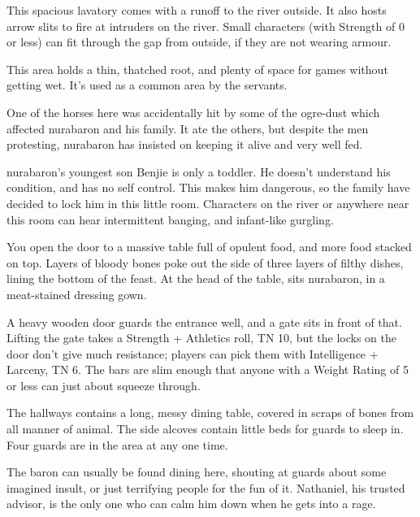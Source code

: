 This spacious lavatory comes with a runoff to the river outside.
It also hosts arrow slits to fire at intruders on the river.
Small characters (with Strength of 0 or less) can fit through the gap from outside, if they are not wearing armour.


This area holds a thin, thatched root, and plenty of space for games without getting wet.
It's used as a common area by the servants.


One of the horses here was accidentally hit by some of the ogre-dust which affected \gls{nurabaron} and his family.  It ate the others, but despite the men protesting, \gls{nurabaron} has insisted on keeping it alive and very well fed.


\Gls{nurabaron}'s youngest son Benjie is only a toddler.
He doesn't understand his condition, and has no self control.
This makes him dangerous, so the family have decided to lock him in this little room.
Characters on the river or anywhere near this room can hear intermittent banging, and infant-like gurgling.


\begin{boxtext}

  You open the door to a massive table full of opulent food, and more food stacked on top.  Layers of bloody bones poke out the side of three layers of filthy dishes, lining the bottom of the feast.  At the head of the table, sits \gls{nurabaron}, in a meat-stained dressing gown.

\end{boxtext}

A heavy wooden door guards the entrance well, and a gate sits in front of that.  Lifting the gate takes a Strength + Athletics roll, TN 10, but the locks on the door don't give much resistance; players can pick them with Intelligence + Larceny, TN 6.  The bars are slim enough that anyone with a Weight Rating of 5 or less can just about squeeze through.

The hallways contains a long, messy dining table, covered in scraps of bones from all manner of animal.  The side alcoves contain little beds for guards to sleep in.  Four guards are in the area at any one time.

The baron can usually be found dining here, shouting at guards about some imagined insult, or just terrifying people for the fun of it.  Nathaniel, his trusted advisor, is the only one who can calm him down when he gets into a rage.

